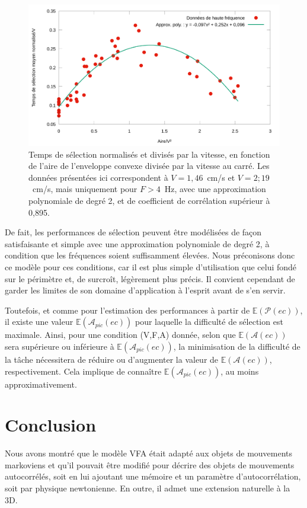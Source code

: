 	\begin{figure}[!htbp]
		\centering
		\includegraphics[width=\textwidth]{figures/ch4/perf_V_RealArea_better_fit}
		\caption[MTSN/V en fonction de l'aire/V² et approximation]{Temps de sélection normalisés et divisés par la vitesse, en fonction de l'aire de l'enveloppe convexe divisée par la vitesse au carré. Les données présentées ici correspondent à $V = 1,46$~cm/s et $V = 2;19$~cm/s, mais uniquement pour $F > 4$~Hz, avec une approximation polynomiale de degré 2, et de coefficient de corrélation supérieur à 0,895.}
		\label{fig:perf_V_RealArea_better_fit}
	\end{figure}
	
	De fait, les performances de sélection peuvent être modélisées de façon satisfaisante et simple avec une approximation polynomiale de degré 2, à condition que les fréquences soient suffisamment élevées. Nous préconisons donc ce modèle pour ces conditions, car il est plus simple d'utilisation que celui fondé sur le périmètre et, de surcroît, légèrement plus précis. Il convient cependant de garder les limites de son domaine d'application à l'esprit avant de s'en servir.
	
	Toutefois, et comme pour l'estimation des performances à partir de $\mathbb{E}(\mathcal{P}(ec))$, il existe une valeur $\mathbb{E}(\mathcal{A}_{pic}(ec))$ pour laquelle la difficulté de sélection est maximale. Ainsi, pour une condition (V,F,A) donnée, selon que $\mathbb{E}(\mathcal{A}(ec))$ sera supérieure ou inférieure à $\mathbb{E}(\mathcal{A}_{pic}(ec))$, la minimisation de la difficulté de la tâche nécessitera de réduire ou d'augmenter la valeur de $\mathbb{E}(\mathcal{A}(ec))$, respectivement. Cela implique de connaître $\mathbb{E}(\mathcal{A}_{pic}(ec))$, au moins approximativement.

\section{Conclusion}
	Nous avons montré que le modèle VFA était adapté aux objets de mouvements markoviens et qu'il pouvait être modifié pour décrire des objets de mouvements autocorrélés, soit en lui ajoutant une mémoire et un paramètre d'autocorrélation, soit par physique newtonienne. En outre, il admet une extension naturelle à la 3D.
	
